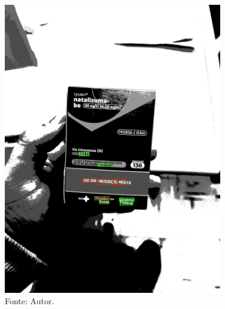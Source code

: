 \begin{frame}
\begin{columns}
\begin{column}{0.5\textwidth}
\begin{figure}
				\includegraphics[width=0.85\textwidth]{../pictures/tysabri_rgb_thresh_gray_thresh_boxes.jpg}
				\caption*{Fonte: Autor.}
			\end{figure}
		\end{column}
	\end{columns}
\end{frame}

